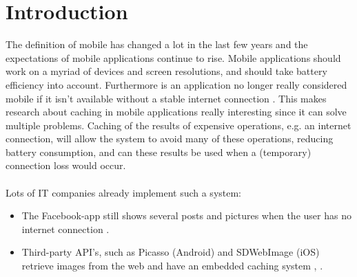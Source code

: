 \documentclass[pdftex,a4paper,12pt,twoside]{report}
\begin{document}
\tableofcontents



\chapter{Introduction}
\label{ch:introduction}
The definition of mobile has changed a lot in the last few years and the expectations of mobile applications continue to rise.
Mobile applications should work on a myriad of devices and screen resolutions, and should take battery efficiency into account.
Furthermore is an application no longer really considered mobile if it isn't available without a stable internet connection \citep{mobile_app_requirements}.
This makes research about caching in mobile applications really interesting since it can solve multiple problems.
Caching of the results of expensive operations, e.g. an internet connection, will allow the system to avoid many of these operations,
reducing battery consumption, and can these results be used when a (temporary) connection loss would occur.
\\\\
Lots of IT companies already implement such a system:
\begin{itemize}
\item The Facebook-app still shows several posts and pictures when the user has no internet connection \citep{facebook_app}.
\item Third-party API's, such as Picasso (Android) and SDWebImage (iOS) retrieve images from the web and have an embedded caching system \citep{picasso_cache}, \citep{sdwebimage_cache}.
\end{itemize}
\newpage
\end{document}
